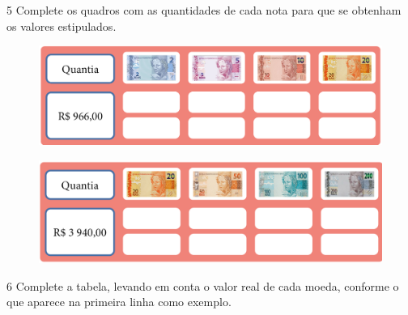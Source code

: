 
\pagebreak
\num{5} Complete os quadros com as quantidades de cada nota para que se obtenham os valores estipulados.

\begin{figure}[htpb!]
\includegraphics[width=\textwidth]{../ilustracoes/MAT5/SAEB_5ANO_MAT_figura51.png}
\end{figure}


\begin{figure}[htpb!]
\includegraphics[width=\textwidth]{../ilustracoes/MAT5/SAEB_5ANO_MAT_figura52.png}
\end{figure}



\pagebreak
\num{6} Complete a tabela, levando em conta o valor real de cada
moeda, conforme o que aparece na primeira linha como exemplo.

